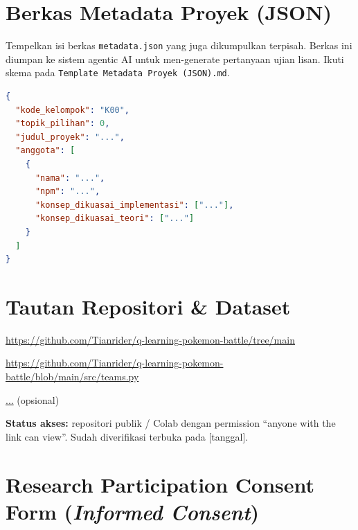 \documentclass[11pt,a4paper,oneside]{report}
\renewcommand{\appendixname}{LAMPIRAN}
\begin{document}
\chapter{Berkas Metadata Proyek (JSON)}
\label{lamp:metadata}

\begin{petunjuk}
Tempelkan isi berkas \texttt{metadata.json} yang juga dikumpulkan terpisah. Berkas ini diumpan ke sistem agentic AI untuk men-generate pertanyaan ujian lisan. Ikuti skema pada \texttt{Template Metadata Proyek (JSON).md}.
\end{petunjuk}

\begin{lstlisting}[language=json]
{
  "kode_kelompok": "K00",
  "topik_pilihan": 0,
  "judul_proyek": "...",
  "anggota": [
    {
      "nama": "...",
      "npm": "...",
      "konsep_dikuasai_implementasi": ["..."],
      "konsep_dikuasai_teori": ["..."]
    }
  ]
}
\end{lstlisting}

\chapter{Tautan Repositori \& Dataset}
\label{lamp:tautan}

\begin{description}[leftmargin=4cm,labelwidth=3.5cm]
    \item[GitHub repo:] \url{https://github.com/Tianrider/q-learning-pokemon-battle/tree/main}
    \item[Dataset mandiri:] \url{https://github.com/Tianrider/q-learning-pokemon-battle/blob/main/src/teams.py}
    \item[Video demo:] \url{...} (opsional)
\end{description}

\textbf{Status akses:} repositori publik / Colab dengan permission ``anyone with the link can view''. Sudah diverifikasi terbuka pada [tanggal].

\renewcommand{\appendixname}{APPENDIX}

\chapter{Research Participation Consent Form (\textit{Informed Consent})}
\label{lamp:consent}
\end{document}
